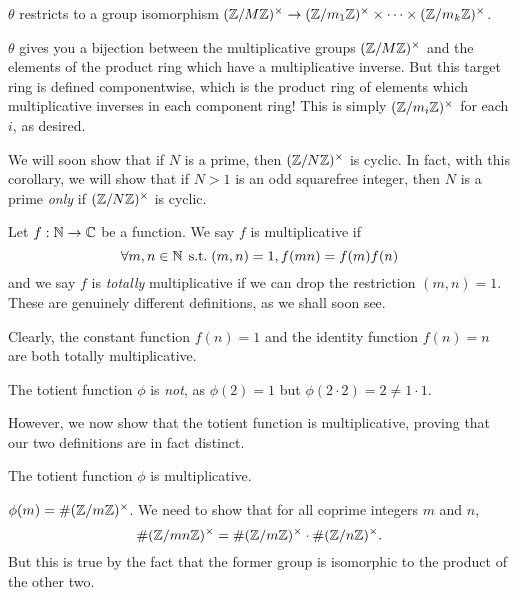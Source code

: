 \documentclass{article}
\begin{document}
\begin{corollary}
    $\theta$ restricts to a group isomorphism $(\mathbb{Z}/M\mathbb{Z})^\times \to (\mathbb{Z}/m_1\mathbb{Z})^\times \times \dots \times (\mathbb{Z}/m_k\mathbb{Z})^\times$.
\end{corollary}

\begin{prf}
	$\theta$ gives you a bijection between the multiplicative groups $(\mathbb{Z}/M\mathbb{Z})^\times$ and the elements of the product ring which have a multiplicative inverse. But this target ring is defined componentwise, which is the product ring of elements which multiplicative inverses in each component ring! This is simply $(\mathbb{Z}/m_i\mathbb{Z})^\times$ for each $i$, as desired.
\end{prf}

We will soon show that if $N$ is a prime, then $(\mathbb{Z}/N\mathbb{Z})^\times$ is cyclic. In fact, with this corollary, we will show that if $N > 1$ is an odd squarefree integer, then $N$ is a prime \textit{only} if $(\mathbb{Z}/N\mathbb{Z})^\times$ is cyclic.

\begin{definition}
	\label{multiplicative-function}
	Let $f: \mathbb{N} \to \mathbb{C}$ be a function. We say $f$ is multiplicative if
	\[
	\forall m, n \in \mathbb{N} \mathrel{\, \text{s.t.}} (m, n) = 1, f(mn) = f(m)f(n)
	\]
	and we say $f$ is \textit{totally} multiplicative if we can drop the restriction $(m, n) = 1$. These are genuinely different definitions, as we shall soon see.
\end{definition}

\begin{corollary}
    Clearly, the constant function $f(n) = 1$ and the identity function $f(n) = n$ are both totally multiplicative.
\end{corollary}

\begin{corollary}
    The totient function $\phi$ is \textit{not}, as $\phi(2) = 1$ but $\phi(2\cdot 2) = 2 \neq 1 \cdot 1$.
\end{corollary}

However, we now show that the totient function is multiplicative, proving that our two definitions are in fact distinct.

\begin{proposition}
	The totient function $\phi$ is multiplicative.
\end{proposition}

\begin{prf}
	$\phi(m) = \# (\mathbb{Z}/m\mathbb{Z})^\times$. We need to show that for all coprime integers $m$ and $n$,
	\[
	\# (\mathbb{Z}/mn\mathbb{Z})^\times = \# (\mathbb{Z}/m\mathbb{Z})^\times \cdot \# (\mathbb{Z}/n\mathbb{Z})^\times.
	\]
	But this is true by the fact that the former group is isomorphic to the product of the other two.
\end{prf}
\end{document}
